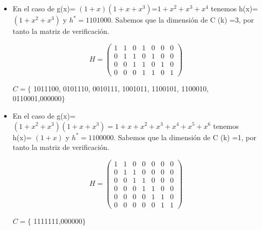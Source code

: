 \documentclass{beamer}
\theoremstyle{plain}
\theoremstyle{example}
\theoremstyle{example}
\begin{document}
\begin{frame}  \small

\begin{itemize}
\item En el caso de g(x)= $(1+x)(1+x+x^3)$=$1+x^2+x^3+x^4$ tenemos h(x)= $(1+x^2+x^3)$
y $h^* =1101000$. Sabemos que la dimensión de C (k) =3, por tanto la matriz de verificación.

\[
    H =   \left( \begin{array}{ccccccc}
     				  1 &  1  & 0  & 1 & 0  & 0  & 0\\ 
					  0 &  1  & 1	&  0 & 1 &	 0  & 0\\ 
					  0 &  0  & 1  &  1 & 0 & 1  & 0\\
					  0 &  0  & 0  &  1 & 1 & 0  & 1
           			\end{array}
    		\right) 	    		
\]

\vspace*{5pt}
$C=\{$ 1011100, 0101110, 0010111, 1001011, 1100101, 1100010, 0110001,000000$\}$
\vspace*{5pt}

\end{itemize}

\end{frame} 


\begin{frame}  \small 


\begin{itemize}
\item En el caso de g(x)= $(1+x^2+x^3) (1+x+x^3)=1+x+x^2+x^3+x^4+x^5+x^6$ tenemos h(x)= $(1+x)$
y $h^* =1100000$. Sabemos que la dimensión de C (k) =1, por tanto la matriz de verificación.

\[
    H =   \left( \begin{array}{ccccccc}
     				  1 &  1  & 0  & 0 & 0  & 0  & 0\\ 
					  0 &  1  & 1	&  0 & 0 &	 0  & 0\\ 
					  0 &  0  & 1  &  1 & 0 & 0  & 0\\
					  0 &  0  & 0  &  1 & 1 & 0  & 0\\
					  0 &  0  & 0  &  0 & 1 & 1  & 0\\
					  0 &  0  & 0  &  0 & 0 & 1  & 1
           			\end{array}
    		\right) 	    		
\]


\vspace*{5pt}
$C=\{$ 1111111,000000$\}$


\end{itemize}

\end{frame} 
\end{document}

